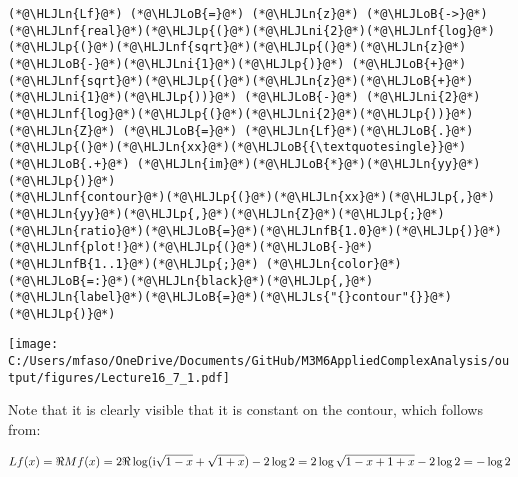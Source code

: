 \documentclass[12pt,a4paper]{article}
\newcommand{\HLJLn}[1]{#1}
\newcommand{\HLJLnf}[1]{\textcolor[RGB]{66,102,213}{#1}}
\newcommand{\HLJLs}[1]{\textcolor[RGB]{201,61,57}{#1}}
\newcommand{\HLJLnfB}[1]{\textcolor[RGB]{59,151,46}{#1}}
\newcommand{\HLJLni}[1]{\textcolor[RGB]{59,151,46}{#1}}
\newcommand{\HLJLoB}[1]{\textcolor[RGB]{102,102,102}{\textbf{#1}}}
\newcommand{\HLJLp}[1]{#1}
\def\I{ {\rm i} }
\begin{document}
\begin{lstlisting}
(*@\HLJLn{Lf}@*) (*@\HLJLoB{=}@*) (*@\HLJLn{z}@*) (*@\HLJLoB{->}@*) (*@\HLJLnf{real}@*)(*@\HLJLp{(}@*)(*@\HLJLni{2}@*)(*@\HLJLnf{log}@*)(*@\HLJLp{(}@*)(*@\HLJLnf{sqrt}@*)(*@\HLJLp{(}@*)(*@\HLJLn{z}@*)(*@\HLJLoB{-}@*)(*@\HLJLni{1}@*)(*@\HLJLp{)}@*) (*@\HLJLoB{+}@*) (*@\HLJLnf{sqrt}@*)(*@\HLJLp{(}@*)(*@\HLJLn{z}@*)(*@\HLJLoB{+}@*)(*@\HLJLni{1}@*)(*@\HLJLp{))}@*) (*@\HLJLoB{-}@*) (*@\HLJLni{2}@*)(*@\HLJLnf{log}@*)(*@\HLJLp{(}@*)(*@\HLJLni{2}@*)(*@\HLJLp{))}@*)
(*@\HLJLn{Z}@*) (*@\HLJLoB{=}@*) (*@\HLJLn{Lf}@*)(*@\HLJLoB{.}@*)(*@\HLJLp{(}@*)(*@\HLJLn{xx}@*)(*@\HLJLoB{{\textquotesingle}}@*) (*@\HLJLoB{.+}@*) (*@\HLJLn{im}@*)(*@\HLJLoB{*}@*)(*@\HLJLn{yy}@*)(*@\HLJLp{)}@*)
(*@\HLJLnf{contour}@*)(*@\HLJLp{(}@*)(*@\HLJLn{xx}@*)(*@\HLJLp{,}@*)(*@\HLJLn{yy}@*)(*@\HLJLp{,}@*)(*@\HLJLn{Z}@*)(*@\HLJLp{;}@*)(*@\HLJLn{ratio}@*)(*@\HLJLoB{=}@*)(*@\HLJLnfB{1.0}@*)(*@\HLJLp{)}@*)
(*@\HLJLnf{plot!}@*)(*@\HLJLp{(}@*)(*@\HLJLoB{-}@*)(*@\HLJLnfB{1..1}@*)(*@\HLJLp{;}@*) (*@\HLJLn{color}@*)(*@\HLJLoB{=:}@*)(*@\HLJLn{black}@*)(*@\HLJLp{,}@*) (*@\HLJLn{label}@*)(*@\HLJLoB{=}@*)(*@\HLJLs{"{}contour"{}}@*)(*@\HLJLp{)}@*)
\end{lstlisting}

\texttt{[image: C:/Users/mfaso/OneDrive/Documents/GitHub/M3M6AppliedComplexAnalysis/output/figures/Lecture16\_7\_1.pdf]}

Note that it is clearly visible that it is constant on the contour, which follows from:

\[
L f(x) = \Re M f(x) = 2\Re \log(\I \sqrt{1-x} + \sqrt{1+x}) -2 \log 2 = 2 \log\sqrt{1-x+1+x} - 2 \log 2 = - \log 2
\]
\end{document}
